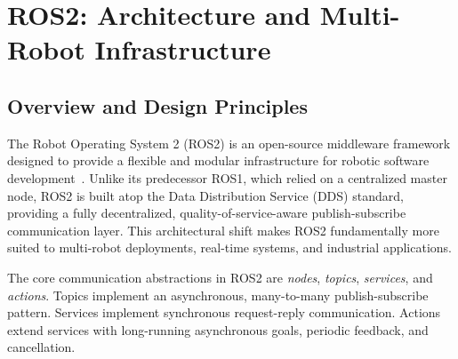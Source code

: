 \documentclass[12pt,a4paper]{article}
\theoremstyle{definition}
\theoremstyle{plain}
\begin{document}
\newpage
\section{ROS2: Architecture and Multi-Robot Infrastructure}
\label{sec:ros2}


\subsection{Overview and Design Principles}

The Robot Operating System 2 (ROS2) is an open-source middleware framework designed to provide a
flexible and modular infrastructure for robotic software
development~\cite{macenski2022robot}. Unlike its predecessor ROS1, which relied on a centralized
master node, ROS2 is built atop the Data Distribution Service (DDS) standard, providing a fully
decentralized, quality-of-service-aware publish-subscribe communication layer. This architectural
shift makes ROS2 fundamentally more suited to multi-robot deployments, real-time systems, and
industrial applications.

The core communication abstractions in ROS2 are \textit{nodes}, \textit{topics},
\textit{services}, and \textit{actions}. Topics implement an asynchronous, many-to-many
publish-subscribe pattern. Services implement synchronous request-reply communication. Actions
extend services with long-running asynchronous goals, periodic feedback, and cancellation.
\end{document}
